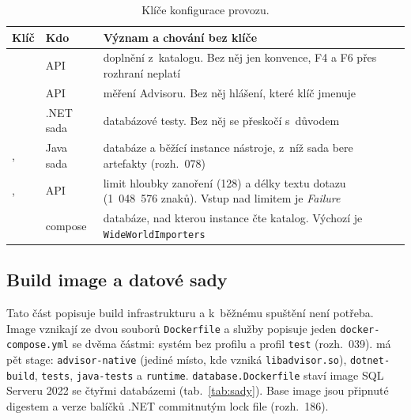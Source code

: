 \begin{table}[H]
\centering\footnotesize
\begin{tabularx}{\textwidth}{L{5cm} L{1.5cm} Y}
\toprule
\textbf{Klíč} & \textbf{Kdo} & \textbf{Význam a chování bez klíče} \\
\midrule
{} & API & doplnění z~katalogu. Bez něj jen konvence, F4 a F6 přes rozhraní neplatí \\
 & API & měření Advisoru. Bez něj hlášení, které klíč jmenuje \\
 & .NET sada & databázové testy. Bez něj se přeskočí s~důvodem \\
,  & Java sada & databáze a běžící instance nástroje, z~níž sada bere artefakty (rozh.~078) \\
,  & API & limit hloubky zanoření (128) a délky textu dotazu (1~048~576 znaků). Vstup nad limitem je \emph{Failure} \\
 & compose & databáze, nad kterou instance čte katalog. Výchozí je \texttt{WideWorldImporters} \\
\bottomrule
\end{tabularx}%
\caption{Klíče konfigurace provozu.}
\label{tab:konfigurace}
\end{table}

\subsection{Build image a datové sady}\label{sec:build}

Tato část popisuje build infrastrukturu a k~běžnému spuštění není potřeba. Image vznikají ze dvou souborů \texttt{Dockerfile} a služby popisuje jeden \texttt{docker-compose.yml} se dvěma částmi: systém bez profilu a profil \texttt{test} (rozh.~039).  má pět stage: \texttt{advisor-native} (jediné místo, kde vzniká \texttt{libadvisor.so}), \texttt{dotnet-build}, \texttt{tests}, \texttt{java-tests} a \texttt{runtime}. \texttt{database.Dockerfile} staví image SQL Serveru 2022 se čtyřmi databázemi (tab.~\ref{tab:sady}). Base image jsou připnuté digestem a verze balíčků .NET commitnutým lock file (rozh.~186).

